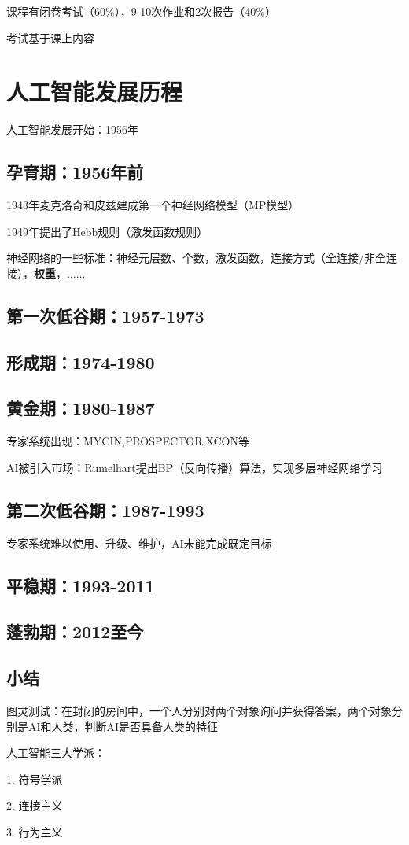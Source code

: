 \begin{notation}
    课程有闭卷考试（60\%），9-10次作业和2次报告（40\%）

    考试基于课上内容
\end{notation}
\section{人工智能发展历程}%
\label{sec:人工智能发展历程}
人工智能发展开始：1956年
\subsection*{孕育期：1956年前}%
\label{sub:孕育期：1956年前}
\begin{notation}
    1943年麦克洛奇和皮兹建成第一个神经网络模型（MP模型）

    1949年提出了Hebb规则（激发函数规则）
\end{notation}
神经网络的一些标准：神经元层数、个数，激发函数，连接方式（全连接/非全连接），\textbf{权重}，$\ldots\ldots$
\subsection*{第一次低谷期：1957-1973}%
\label{sub:第一次低谷期：1957-1973}

\subsection*{形成期：1974-1980}%
\label{sub:形成期：1974-1980}

\subsection*{黄金期：1980-1987}%
\label{sub:黄金期：1980-1987}
专家系统出现：MYCIN,PROSPECTOR,XCON等

AI被引入市场：Rumelhart提出BP（反向传播）算法，实现多层神经网络学习

\subsection*{第二次低谷期：1987-1993}%
\label{sub:第二次低谷期：1987-1993}
专家系统难以使用、升级、维护，AI未能完成既定目标

\subsection*{平稳期：1993-2011}%
\label{sub:平稳期：1993-2011}

\subsection*{蓬勃期：2012至今}%
\label{sub:蓬勃期：2012至今}

\subsection*{小结}%
\label{sub:小结}

\begin{notation}
    图灵测试：在封闭的房间中，一个人分别对两个对象询问并获得答案，两个对象分别是AI和人类，判断AI是否具备人类的特征
\end{notation}

\begin{notation}
    人工智能三大学派：

    1. 符号学派

    2. 连接主义

    3. 行为主义
\end{notation}
